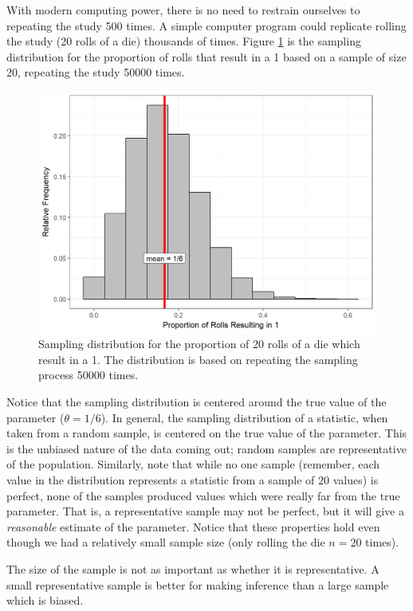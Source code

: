 \documentclass[]{book}
\theoremstyle{plain}
\theoremstyle{mydefn}
\theoremstyle{myexmpl}
\theoremstyle{remark}
\let\BeginKnitrBlock\begin \let\EndKnitrBlock\end
\let\BeginKnitrBlock\begin \let\EndKnitrBlock\end
\begin{document}
With modern computing power, there is no need to restrain ourselves to
repeating the study 500 times. A simple computer program could replicate
rolling the study (20 rolls of a die) thousands of times. Figure
\ref{fig:samplingdistns-dice-histogram} is the sampling distribution for
the proportion of rolls that result in a 1 based on a sample of size 20,
repeating the study 50000 times.

\begin{figure}

{\centering \includegraphics[width=0.8\linewidth]{./Images/samplingdistns-dice-histogram-1} 

}

\caption{Sampling distribution for the proportion of 20 rolls of a die which result in a 1.  The distribution is based on repeating the sampling process 50000 times.}\label{fig:samplingdistns-dice-histogram}
\end{figure}

Notice that the sampling distribution is centered around the true value
of the parameter (\(\theta = 1/6\)). In general, the sampling
distribution of a statistic, when taken from a random sample, is
centered on the true value of the parameter. This is the unbiased nature
of the data coming out; random samples are representative of the
population. Similarly, note that while no one sample (remember, each
value in the distribution represents a statistic from a sample of 20
values) is perfect, none of the samples produced values which were
really far from the true parameter. That is, a representative sample may
not be perfect, but it will give a \emph{reasonable} estimate of the
parameter. Notice that these properties hold even though we had a
relatively small sample size (only rolling the die \(n = 20\) times).

\BeginKnitrBlock{rmdkeyidea}
The size of the sample is not as important as whether it is
representative. A small representative sample is better for making
inference than a large sample which is biased.
\EndKnitrBlock{rmdkeyidea}
\end{document}
